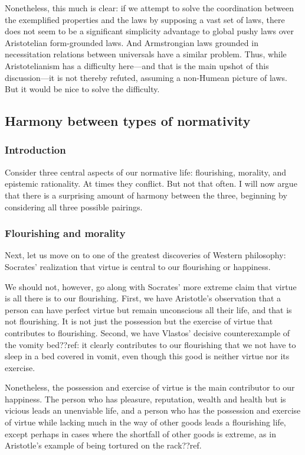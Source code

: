 Nonetheless, this much is clear: if we attempt to solve the coordination between the exemplified properties and 
the laws by supposing a vast set of laws, there does not seem to be a significant simplicity advantage to 
global pushy laws over Aristotelian form-grounded laws. And Armstrongian laws grounded in necessitation relations
between universals have a similar problem. Thus, while Aristotelianism has a difficulty here---and
that is the main upshot of this discussion---it is not thereby refuted, assuming a non-Humean picture of laws.
But it would be nice to solve the difficulty.
 
\subsection{Harmony between types of normativity}
\subsubsection{Introduction}
Consider three central aspects of our normative life: flourishing, morality, and epistemic rationality. At times 
they conflict. But not that often. I will now argue that there is a surprising amount of harmony between the three,
beginning by considering all three possible pairings.

\subsubsection{Flourishing and morality}
Next, let us move on to one of the greatest discoveries of Western philosophy: Socrates' realization that virtue is central to our flourishing or happiness. 

We should not, however, go along with Socrates' more extreme claim that virtue is all there is to our flourishing. 
First, we have Aristotle's observation that a person can have perfect virtue but remain unconscious all their life,
and that is not flourishing. It is not just the possession but the exercise of virtue that contributes to flourishing.
Second, we have Vlastos' decisive counterexample of the vomity bed??ref: it clearly contributes to our flourishing that 
we not have to sleep in a bed covered in vomit, even though this good is neither virtue nor its exercise.

Nonetheless, the possession and exercise of virtue is the main contributor to our happiness. The person who
has pleasure, reputation, wealth and health but is vicious leads an unenviable life, and a person who has
the possession and exercise of virtue while lacking much in the way of other goods leads a flourishing life,
except perhaps in cases where the shortfall of other goods is extreme, as in Aristotle's example of being tortured
on the rack??ref. 

